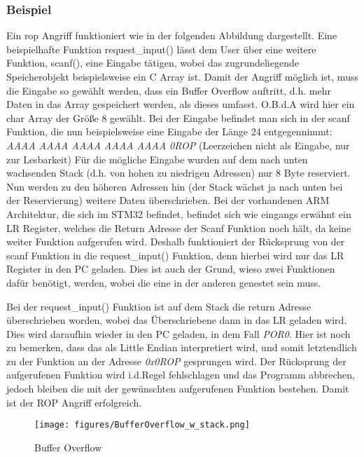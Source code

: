 \documentclass[a4paper,
DIV=13,
12pt,
BCOR=10mm,
department=FakIM,
oneside,
parskip=half,
automark,
listof=totocnumbered,
bibliography=totocnumbered,
acronym=totocnumbered
] {OTHRartcl}
\begin{document}

\subsubsection{Beispiel}
Ein \ac*{rop} Angriff funktioniert wie in der folgenden Abbildung dargestellt.
Eine beispielhafte Funktion request\_input() lässt dem User über eine weitere Funktion, scanf(), eine Eingabe tätigen, wobei das zugrundeliegende Speicherobjekt beispielsweise ein C Array ist.
Damit der Angriff möglich ist, muss die Eingabe so gewählt werden, dass ein Buffer Overflow auftritt, d.h. mehr Daten in das Array gespeichert werden, als dieses umfasst.
O.B.d.A wird hier ein char Array der Größe 8 gewählt. Bei der Eingabe befindet man sich in der scanf Funktion, die nun beispielsweise eine Eingabe der Länge 24 entgegennimmt:
\textit{AAAA AAAA AAAA AAAA AAAA 0ROP}  (Leerzeichen nicht als Eingabe, nur zur Lesbarkeit)
Für die mögliche Eingabe wurden auf dem nach unten wachsenden Stack (d.h. von hohen zu niedrigen Adressen) nur 8 Byte reserviert.
Nun werden zu den höheren Adressen hin (der Stack wächst ja nach unten bei der Reservierung) weitere Daten überschrieben.
Bei der vorhandenen ARM Architektur, die sich im STM32 befindet, befindet sich wie eingangs erwähnt ein LR Register, welches die Return Adresse der Scanf Funktion noch hält, da keine weiter Funktion aufgerufen wird.
Deshalb funktioniert der Rücksprung von der scanf Funktion in die request\_input() Funktion, denn hierbei wird nur das LR Register in den PC geladen.
Dies ist auch der Grund, wieso zwei Funktionen dafür benötigt, werden, wobei die eine in der anderen genestet sein muss.

Bei der request\_input() Funktion ist auf dem Stack die return Adresse überschrieben worden, wobei das Überschriebene dann in das LR geladen wird.
Dies wird daraufhin wieder in den PC geladen, in dem Fall \textit{POR0}. Hier ist noch zu bemerken, dass das als Little Endian interpretiert wird, und somit
letztendlich zu der Funktion an der Adresse \textit{0x0ROP} gesprungen wird.
Der Rücksprung der aufgerufenen Funktion wird i.d.Regel fehlschlagen und das Programm abbrechen, jedoch bleiben die mit der gewünschten aufgerufenen Funktion bestehen.
Damit ist der ROP Angriff erfolgreich.
\begin{figure}[ht!]
  \begin{center}
    \texttt{[image: figures/BufferOverflow\_w\_stack.png]}
    \caption{Buffer Overflow}
    \label{Abbildung 1: Buffer Overflow}
  \end{center}
\end{figure}
\end{document}

